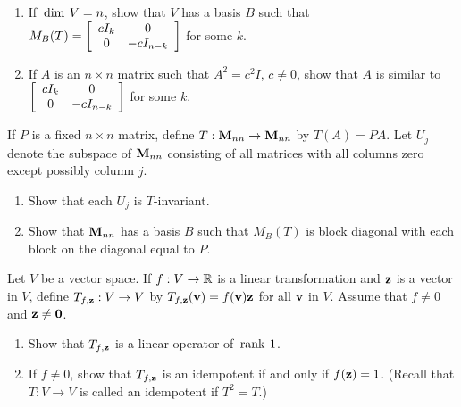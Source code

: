 \begin{multicols}{2}
\begin{ex}
\begin{enumerate}[label={\alph*.}]
\item If $\thinspace\operatorname{dim \medspace}V = n$, show that $V$ has a basis $B$ such that $M_B(T) = \left[ \begin{array}{cc} cI_k & 0 \\ 0 & -cI_{n-k} \end{array} \right]$ for some $k$.

\item If $A$ is an $n \times n$ matrix such that $A^{2} = c^{2}I$, $c \neq 0$, show that $A$ is similar to $\left[ \begin{array}{cc} cI_k & 0 \\ 0 & -cI_{n-k} \end{array} \right]$ for some $k$.

\end{enumerate}
\end{ex}

\begin{ex}
If $P$ is a fixed $n \times n$ matrix, define $T : \textbf{M}_{nn} \to \textbf{M}_{nn}$ by $T(A) = PA$. Let $U_{j}$ denote the subspace of $\textbf{M}_{nn}$ consisting of all matrices with all columns zero except possibly column $j$.


\begin{enumerate}[label={\alph*.}]
\item Show that each $U_{j}$ is $T$-invariant.

\item Show that $\textbf{M}_{nn}$ has a basis $B$ such that $M_{B}(T)$ is block diagonal with each block on the diagonal equal to $P$.

\end{enumerate}
\end{ex}

\begin{ex}
Let $V$ be a vector space. If $f : V \to \mathbb{R}$ is a linear transformation and $\textbf{z}$ is a vector in $V$, define $T_{f,\textbf{z}} : V \to V$ by $T_{f,\textbf{z}}(\textbf{v}) = f(\textbf{v})\textbf{z}$ for all $\textbf{v}$ in $V$. Assume that $f \neq 0$ and $\textbf{z} \neq \textbf{0}$.


\begin{enumerate}[label={\alph*.}]
\item Show that $T_{f,\textbf{z}}$ is a linear operator of $\thinspace\operatorname{rank \medspace}1$.

\item If $f \neq 0$, show that $T_{f,\textbf{z}}$ is an idempotent if and only if $f(\textbf{z}) = 1$. (Recall that $T : V \to V$ is called an idempotent if $T^{2} = T$.)


\end{enumerate}
\end{ex}
\end{multicols}

